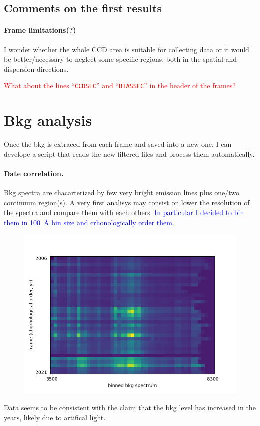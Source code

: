 \documentclass{article}
\newcommand{\arbitrario}[1]{\textcolor{blue}{#1}}
\begin{document}
\subsection{Comments on the first results}

\paragraph{Frame limitations(?)} I wonder whether the whole CCD area is suitable for collecting data or it would be better/necessary to neglect some specific regions, both in the spatial and dispersion directions.

\textcolor{red}{What about the lines ``\texttt{CCDSEC}'' and ``\texttt{BIASSEC}'' in the header of the frames?}


\section{Bkg analysis}
Once the bkg is extraced from each frame and saved into a new one, I can develope a script that reads the new filtered files and process them automatically.

\paragraph{Date correlation.}
Bkg spectra are chacarterized by few very bright emission lines plus one/two continuum region(s). A very first analisys may consist on lower the resolution of the spectra and compare them with each others. \arbitrario{In particular I decided to bin them in \SI{100}{\angstrom} bin size and crhonologically order them.}
\begin{figure}[h!]
	\centering
	\includegraphics[width=.75\textwidth]{../Figure_1}
\end{figure}
Data seems to be consistent with the claim that the bkg level has increased in the years, likely due to artifical light.
\end{document}
